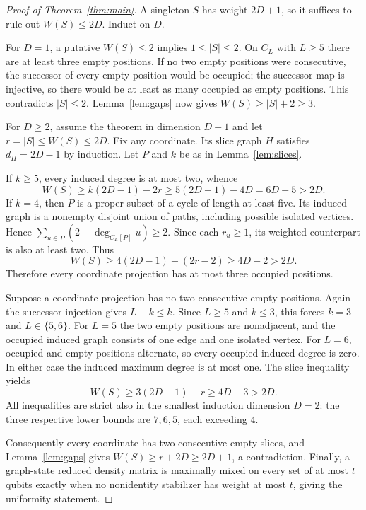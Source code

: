 \documentclass[10pt]{article}
\begin{document}
\begin{proof}[Proof of Theorem~\ref{thm:main}]
A singleton $S$ has weight $2D+1$, so it suffices to rule out $W(S)\le2D$. Induct on $D$.

For $D=1$, a putative $W(S)\le2$ implies $1\le|S|\le2$. On $C_L$ with $L\ge5$ there are at least three empty positions. If no two empty positions were consecutive, the successor of every empty position would be occupied; the successor map is injective, so there would be at least as many occupied as empty positions. This contradicts $|S|\le2$. Lemma~\ref{lem:gaps} now gives $W(S)\ge|S|+2\ge3$.

For $D\ge2$, assume the theorem in dimension $D-1$ and let $r=|S|\le W(S)\le2D$. Fix any coordinate. Its slice graph $H$ satisfies $d_H=2D-1$ by induction. Let $P$ and $k$ be as in Lemma~\ref{lem:slices}.

If $k\ge5$, every induced degree is at most two, whence
\[
 W(S)\ge k(2D-1)-2r\ge5(2D-1)-4D=6D-5>2D.
\]
If $k=4$, then $P$ is a proper subset of a cycle of length at least five. Its induced graph is a nonempty disjoint union of paths, including possible isolated vertices. Hence $\sum_{u\in P}(2-\deg_{C_L[P]}u)\ge2$. Since each $r_u\ge1$, its weighted counterpart is also at least two. Thus
\[
 W(S)\ge4(2D-1)-(2r-2)\ge4D-2>2D.
\]
Therefore every coordinate projection has at most three occupied positions.

Suppose a coordinate projection has no two consecutive empty positions. Again the successor injection gives $L-k\le k$. Since $L\ge5$ and $k\le3$, this forces $k=3$ and $L\in\{5,6\}$. For $L=5$ the two empty positions are nonadjacent, and the occupied induced graph consists of one edge and one isolated vertex. For $L=6$, occupied and empty positions alternate, so every occupied induced degree is zero. In either case the induced maximum degree is at most one. The slice inequality yields
\[
 W(S)\ge3(2D-1)-r\ge4D-3>2D.
\]
All inequalities are strict also in the smallest induction dimension $D=2$: the three respective lower bounds are $7,6,5$, each exceeding $4$.

Consequently every coordinate has two consecutive empty slices, and Lemma~\ref{lem:gaps} gives $W(S)\ge r+2D\ge2D+1$, a contradiction. Finally, a graph-state reduced density matrix is maximally mixed on every set of at most $t$ qubits exactly when no nonidentity stabilizer has weight at most $t$, giving the uniformity statement.
\end{proof}
\end{document}
